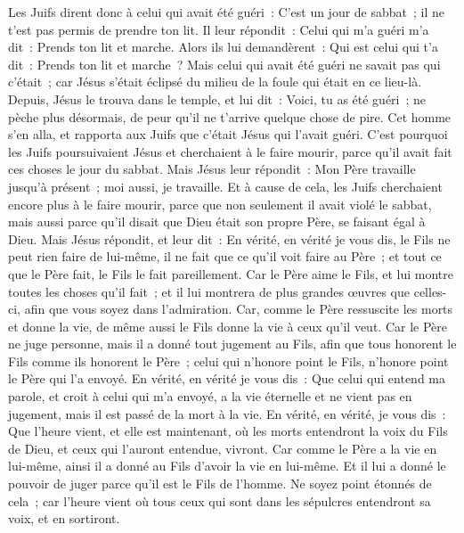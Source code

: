 \begin{multicols}{2}
Les Juifs dirent donc à celui qui avait été guéri~: C'est un jour de sabbat~; il ne t'est pas permis de prendre ton lit.
Il leur répondit~: Celui qui m'a guéri m'a dit~: Prends ton lit et marche.
Alors ils lui demandèrent~: Qui est celui qui t'a dit~: Prends ton lit et marche~?
Mais celui qui avait été guéri ne savait pas qui c'était~; car Jésus s'était éclipsé du milieu de la foule qui était en ce lieu-là.
Depuis, Jésus le trouva dans le temple, et lui dit~: Voici, tu as été guéri~; ne pèche plus désormais, de peur qu'il ne t'arrive quelque chose de pire.
Cet homme s'en alla, et rapporta aux Juifs que c'était Jésus qui l'avait guéri.
C'est pourquoi les Juifs poursuivaient Jésus et cherchaient à le faire mourir, parce qu'il avait fait ces choses le jour du sabbat.
Mais Jésus leur répondit~: Mon Père travaille jusqu'à présent~; moi aussi, je travaille.
Et à cause de cela, les Juifs cherchaient encore plus à le faire mourir, parce que non seulement il avait violé le sabbat, mais aussi parce qu'il disait que Dieu était son propre Père, se faisant égal à Dieu.
Mais Jésus répondit, et leur dit~: En vérité, en vérité je vous dis, le Fils ne peut rien faire de lui-même, il ne fait que ce qu'il voit faire au Père~; et tout ce que le Père fait, le Fils le fait pareillement.
Car le Père aime le Fils, et lui montre toutes les choses qu'il fait~; et il lui montrera de plus grandes œuvres que celles-ci, afin que vous soyez dans l'admiration.
Car, comme le Père ressuscite les morts et donne la vie, de même aussi le Fils donne la vie à ceux qu'il veut.
Car le Père ne juge personne, mais il a donné tout jugement au Fils,
afin que tous honorent le Fils comme ils honorent le Père~; celui qui n'honore point le Fils, n'honore point le Père qui l'a envoyé.
En vérité, en vérité je vous dis~: Que celui qui entend ma parole, et croit à celui qui m'a envoyé, a la vie éternelle et ne vient pas en jugement, mais il est passé de la mort à la vie.
En vérité, en vérité, je vous dis~: Que l'heure vient, et elle est maintenant, où les morts entendront la voix du Fils de Dieu, et ceux qui l'auront entendue, vivront.
Car comme le Père a la vie en lui-même, ainsi il a donné au Fils d'avoir la vie en lui-même.
Et il lui a donné le pouvoir de juger parce qu'il est le Fils de l'homme.
Ne soyez point étonnés de cela~; car l'heure vient où tous ceux qui sont dans les sépulcres entendront sa voix, et en sortiront.

\end{multicols}
